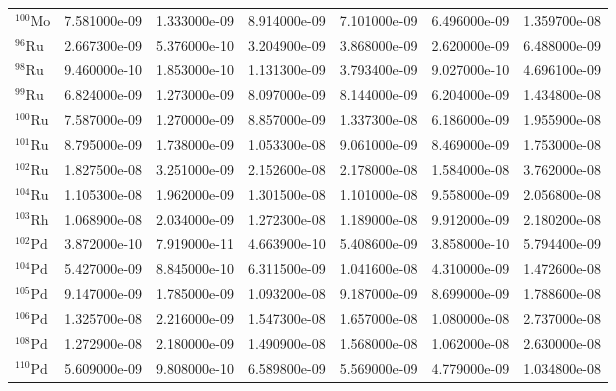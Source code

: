 \begin{tabular}{lrrrrrr}
$^{100}\mathrm{Mo}$ &       7.581000e-09 &      1.333000e-09 &      8.914000e-09 &       7.101000e-09 &      6.496000e-09 &      1.359700e-08 \\
$^{96}\mathrm{Ru}$  &       2.667300e-09 &      5.376000e-10 &      3.204900e-09 &       3.868000e-09 &      2.620000e-09 &      6.488000e-09 \\
$^{98}\mathrm{Ru}$  &       9.460000e-10 &      1.853000e-10 &      1.131300e-09 &       3.793400e-09 &      9.027000e-10 &      4.696100e-09 \\
$^{99}\mathrm{Ru}$  &       6.824000e-09 &      1.273000e-09 &      8.097000e-09 &       8.144000e-09 &      6.204000e-09 &      1.434800e-08 \\
$^{100}\mathrm{Ru}$ &       7.587000e-09 &      1.270000e-09 &      8.857000e-09 &       1.337300e-08 &      6.186000e-09 &      1.955900e-08 \\
$^{101}\mathrm{Ru}$ &       8.795000e-09 &      1.738000e-09 &      1.053300e-08 &       9.061000e-09 &      8.469000e-09 &      1.753000e-08 \\
$^{102}\mathrm{Ru}$ &       1.827500e-08 &      3.251000e-09 &      2.152600e-08 &       2.178000e-08 &      1.584000e-08 &      3.762000e-08 \\
$^{104}\mathrm{Ru}$ &       1.105300e-08 &      1.962000e-09 &      1.301500e-08 &       1.101000e-08 &      9.558000e-09 &      2.056800e-08 \\
$^{103}\mathrm{Rh}$ &       1.068900e-08 &      2.034000e-09 &      1.272300e-08 &       1.189000e-08 &      9.912000e-09 &      2.180200e-08 \\
$^{102}\mathrm{Pd}$ &       3.872000e-10 &      7.919000e-11 &      4.663900e-10 &       5.408600e-09 &      3.858000e-10 &      5.794400e-09 \\
$^{104}\mathrm{Pd}$ &       5.427000e-09 &      8.845000e-10 &      6.311500e-09 &       1.041600e-08 &      4.310000e-09 &      1.472600e-08 \\
$^{105}\mathrm{Pd}$ &       9.147000e-09 &      1.785000e-09 &      1.093200e-08 &       9.187000e-09 &      8.699000e-09 &      1.788600e-08 \\
$^{106}\mathrm{Pd}$ &       1.325700e-08 &      2.216000e-09 &      1.547300e-08 &       1.657000e-08 &      1.080000e-08 &      2.737000e-08 \\
$^{108}\mathrm{Pd}$ &       1.272900e-08 &      2.180000e-09 &      1.490900e-08 &       1.568000e-08 &      1.062000e-08 &      2.630000e-08 \\
$^{110}\mathrm{Pd}$ &       5.609000e-09 &      9.808000e-10 &      6.589800e-09 &       5.569000e-09 &      4.779000e-09 &      1.034800e-08 \\

\end{tabular}
